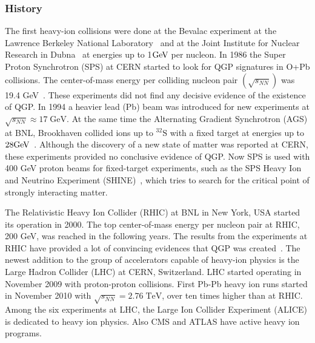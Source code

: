 \subsubsection{History}
The first heavy-ion collisions were done at the Bevalac experiment at the Lawrence Berkeley National Laboratory~\cite{Lofgren_1975} and at the Joint Institute for Nuclear Research in Dubna~\cite{kovalenko1994status} at energies up to 1$\mathrm{GeV}\kern-0.05em$ per nucleon.
In 1986 the Super Proton Synchrotron (SPS) at CERN started to look for QGP signatures in O+Pb collisions. The center-of-mass energy per colliding nucleon pair $\left(\sqrt{s_{NN}}\right)$ was 19.4 GeV~\cite{Vitev:2002pf}. These experiments did not find any decisive evidence of the existence of QGP. In 1994 a heavier lead (Pb) beam was introduced for new experiments at $\sqrt{s_{NN}}\approx 17\; \mathrm{GeV}$. At the same time the Alternating Gradient Synchrotron (AGS) at BNL, Brookhaven collided ions up to $\mathrm{^{32}S}$ with a fixed target at energies up to $28\mathrm{GeV}\kern-0.05em$~\cite{Barton:1987}. Although the discovery of a new state of matter was reported at CERN, these experiments provided no conclusive evidence of QGP. Now SPS is used with 400 GeV proton beams for fixed-target experiments, such as the SPS Heavy Ion and Neutrino Experiment (SHINE)~\cite{Grebieszkow:2013nza}, which tries to search for the critical point of strongly interacting matter.

The Relativistic Heavy Ion Collider (RHIC) at BNL in New York, USA started its  operation in 2000. The top center-of-mass energy per nucleon pair at RHIC, 200 GeV, was reached in the following years. The results from the experiments at RHIC have provided a lot of convincing evidences that QGP was created~\cite{Adcox:2004mh, Adams:2005dq, Arsene:2004fa, Back:2004je}. The newest addition to the group of accelerators capable of heavy-ion physics is the Large Hadron Collider (LHC) at CERN, Switzerland. LHC started operating in November 2009 with proton-proton collisions. First Pb-Pb heavy ion runs started in November 2010 with $\sqrt{s_{NN}}=2.76\; \mathrm{TeV}$,  over ten times higher than at RHIC. Among the six experiments at LHC, the Large Ion Collider Experiment (ALICE) is dedicated to heavy ion physics. Also CMS and ATLAS have active heavy ion programs. 




